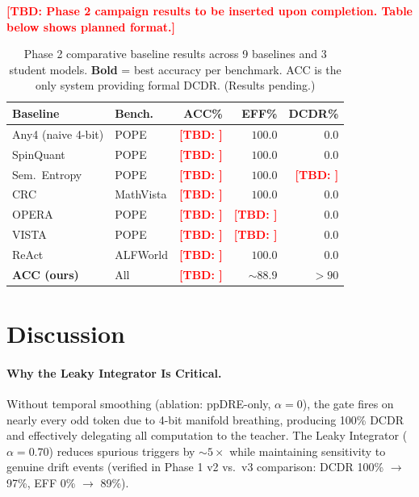 \documentclass[runningheads]{llncs}
\newcommand{\TBD}[1]{\textcolor{red}{\textbf{[TBD: #1]}}}
\begin{document}
\TBD{Phase 2 campaign results to be inserted upon completion.
Table below shows planned format.}

\begin{table}[t]
  \centering
  \caption{Phase 2 comparative baseline results across 9 baselines and
  3 student models. \textbf{Bold} = best accuracy per benchmark.
  ACC is the only system providing formal DCDR. (Results pending.)}
  \label{tab:baselines}
  \small
  \begin{tabular}{@{}llrrr@{}}
    \toprule
    \textbf{Baseline} & \textbf{Bench.} & \textbf{ACC\%} & \textbf{EFF\%} & \textbf{DCDR\%} \\
    \midrule
    Any4 (naive 4-bit) & POPE & \TBD{} & $100.0$ & $0.0$ \\
    SpinQuant          & POPE & \TBD{} & $100.0$ & $0.0$ \\
    Sem.\ Entropy      & POPE & \TBD{} & $100.0$ & \TBD{} \\
    CRC                & MathVista & \TBD{} & $100.0$ & $0.0$ \\
    OPERA              & POPE & \TBD{} & \TBD{}   & $0.0$ \\
    VISTA              & POPE & \TBD{} & \TBD{}   & $0.0$ \\
    ReAct              & ALFWorld & \TBD{} & $100.0$ & $0.0$ \\
    \textbf{ACC (ours)} & All & \textbf{\TBD{}} & $\sim88.9$ & $>90$ \\
    \bottomrule
  \end{tabular}
\end{table}

\section{Discussion}
\label{sec:discussion}

\paragraph{Why the Leaky Integrator Is Critical.}
Without temporal smoothing (ablation: ppDRE-only, $\alpha=0$), the gate
fires on nearly every odd token due to 4-bit manifold breathing,
producing 100\% DCDR and effectively delegating all computation to the
teacher. The Leaky Integrator ($\alpha=0.70$) reduces spurious triggers
by $\sim\!5\times$ while maintaining sensitivity to genuine drift events
(verified in Phase 1 v2 vs.\ v3 comparison: DCDR 100\% $\to$ 97\%,
EFF 0\% $\to$ 89\%).
\end{document}

